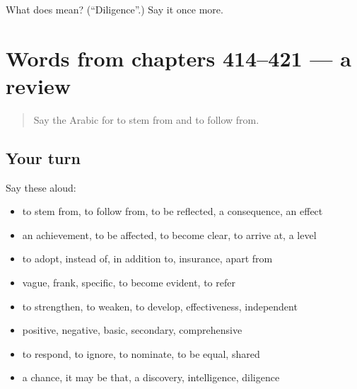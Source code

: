 \begin{tcolorbox}[breakable,colback=teal!4,colframe=teal!35!black,title={Before you move on}]
What does  mean? (\textquotedblleft{}Diligence\textquotedblright{}.) Say it once more.
\end{tcolorbox}
\section[(dialogue)]{Words from chapters 414–421 — a review}

\label{lesson:AR-R421-review-414-421}



\begin{quote}
Say the Arabic for to stem from and to follow from.
\end{quote}

\subsection*{Your turn}
Say these aloud:

\begin{itemize}
\raggedright
  \item to stem from, to follow from, to be reflected, a consequence, an effect
  \item an achievement, to be affected, to become clear, to arrive at, a level
  \item to adopt, instead of, in addition to, insurance, apart from
  \item vague, frank, specific, to become evident, to refer
  \item to strengthen, to weaken, to develop, effectiveness, independent
  \item positive, negative, basic, secondary, comprehensive
  \item to respond, to ignore, to nominate, to be equal, shared
  \item a chance, it may be that, a discovery, intelligence, diligence
\end{itemize}

